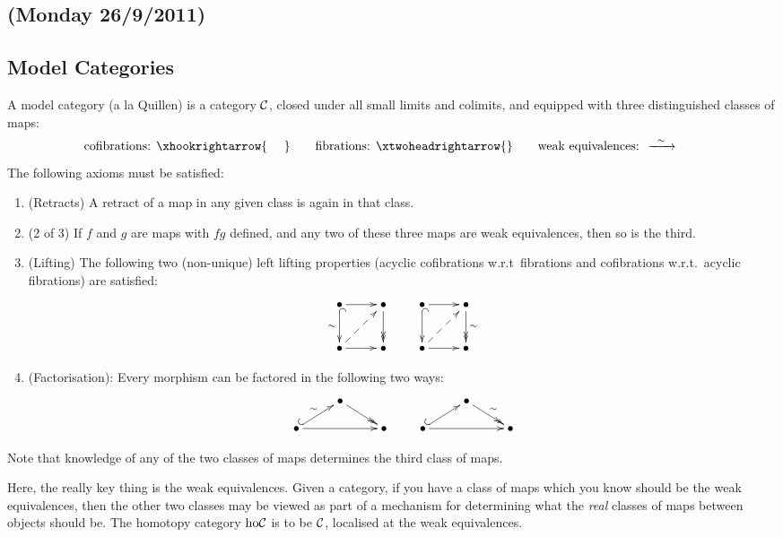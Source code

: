 \documentclass[11pt]{article}
\newcommand{\NewLecture}[3]{\section{#1 {\small(#2/#3/2011)}}}
\begin{document}
\begin{FifthWeek}
\setcounter{section}{9}
\NewLecture{}{Monday 26}{9}
\subsection*{Model Categories}
A model category (a la Quillen) is a category $\mathcal{C}$, closed under all small limits and colimits, and equipped with three distinguished classes of maps:
\[\text{cofibrations: }\xhookrightarrow{\ \ \ \ }\qquad\text{fibrations: }\xtwoheadrightarrow{}\qquad\text{weak equivalences: }\xrightarrow{\ \,\sim\,\ }\qquad\]
The following axioms must be satisfied:
\begin{enumerate}\squishlist
\item (Retracts) A retract of a map in any given class is again in that class.
\item (2 of 3) If $f$ and $g$ are maps with $fg$ defined, and any two of these  three maps are weak equivalences, then so is the third.
\item (Lifting) The following two (non-unique) left lifting properties (acyclic cofibrations w.r.t\ fibrations and cofibrations w.r.t.\ acyclic fibrations) are satisfied:
\[\xymatrix{
\Bullet\ar[r]\ar@{^{(}->}[d]_\sim&\Bullet\ar@{->>}[d]\\
\Bullet\ar[r]\ar@{-->}[ur]&\Bullet
}\qquad
\xymatrix{
\Bullet\ar[r]\ar@{^{(}->}[d]&\Bullet\ar@{->>}[d]^\sim\\
\Bullet\ar[r]\ar@{-->}[ur]&\Bullet
}\]
\item (Factorisation): Every morphism can be factored in the following two ways:
\[\xymatrix@R=.4cm{
&\Bullet\ar@{->>}[dr]\\
\Bullet\ar@{^{(}->}[ur]^\sim\ar[rr]&&\Bullet
}\qquad
\xymatrix@R=.4cm{
&\Bullet\ar@{->>}[dr]^\sim\\
\Bullet\ar@{^{(}->}[ur]\ar[rr]&&\Bullet
}\]
\end{enumerate}
Note that knowledge of any of the two classes of maps determines the third class of maps.

Here, the really key thing is the weak equivalences. Given a category, if you have a class of maps which you know should be the weak equivalences, then the other two classes may be viewed as part of a mechanism for determining what the \emph{real} classes of maps between objects should be. The homotopy category $\textup{ho}\mathcal{C}$ is to be $\mathcal{C}$, localised at the weak equivalences.


\end{FifthWeek}
\end{document}
